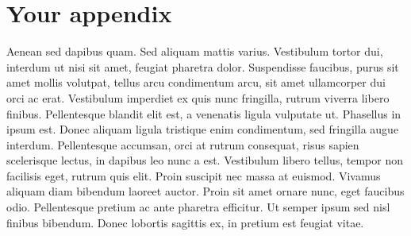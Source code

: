 \documentclass[12pt, twoside]{report}
\begin{document}
\appendix
\chapter{Your appendix}\label{apx:morestuff}
Aenean sed dapibus quam.
Sed aliquam mattis varius.
Vestibulum tortor dui, interdum ut nisi sit amet, feugiat pharetra dolor.
Suspendisse faucibus, purus sit amet mollis volutpat, tellus arcu condimentum arcu, sit amet ullamcorper dui orci ac erat.
Vestibulum imperdiet ex quis nunc fringilla, rutrum viverra libero finibus.
Pellentesque blandit elit est, a venenatis ligula vulputate ut.
Phasellus in ipsum est. Donec aliquam ligula tristique enim condimentum, sed fringilla augue interdum.
Pellentesque accumsan, orci at rutrum consequat, risus sapien scelerisque lectus, in dapibus leo nunc a est. Vestibulum libero tellus, tempor non facilisis eget, rutrum quis elit.
Proin suscipit nec massa at euismod. Vivamus aliquam diam bibendum laoreet auctor.
Proin sit amet ornare nunc, eget faucibus odio.
Pellentesque pretium ac ante pharetra efficitur.
Ut semper ipsum sed nisl finibus bibendum. Donec lobortis sagittis ex, in pretium est feugiat vitae.
\end{document}
